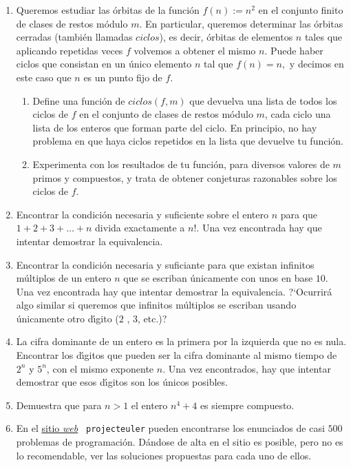 \begin{enumerate}
\item Queremos estudiar las órbitas de la función $f(n):=n^2$ en el conjunto finito de clases de restos módulo $m$. En particular, queremos determinar las órbitas cerradas (también llamadas $ciclos$),  es decir, órbitas de elementos $n$ tales que aplicando repetidas veces $f$ volvemos a obtener el mismo  $n$. Puede haber ciclos que consistan en un único elemento $n$ tal que $f(n)=n,$ y decimos en este caso que $n$ es un punto fijo de $f$.
\begin{enumerate}
 \item    Define una función de {\sage}  $ciclos(f,m)$ que devuelva una lista de todos los ciclos de $f$ en  el conjunto  de clases de restos módulo $m$, cada ciclo una lista de los enteros que forman parte del ciclo. En principio, no hay problema en que haya ciclos repetidos en la lista que devuelve tu función. 
  \item   Experimenta con los resultados de tu función, para diversos valores de $m$ primos y compuestos,  y trata de obtener conjeturas razonables sobre los ciclos de $f$.

\end{enumerate}

\item Encontrar la condici\'on necesaria y suficiente sobre el entero $n$ para que $1+2+3+\dots+n$ divida exactamente a $n!.$ Una vez encontrada hay que intentar demostrar la equivalencia.

\item Encontrar la condici\'on necesaria y suficiante para que existan infinitos m\'ultiplos de un entero $n$ que se escriban \'unicamente con unos en base $10$.  Una vez encontrada hay que intentar demostrar la equivalencia. ?`Ocurrir\'a algo similar  si queremos que infinitos m\'ultiplos se escriban usando \'unicamente otro d\'{\i}gito ($2$ , $3$, etc.)? 

\item La cifra dominante de un entero es la primera por la izquierda que no es nula. Encontrar los d\'{\i}gitos   que pueden ser la cifra dominante al mismo tiempo de $2^n$ y $5^n$, con el mismo exponente $n$.  Una vez encontrados, hay que intentar demostrar que esos d\'{\i}gitos son los \'unicos posibles. 

\item Demuestra que para $n>1$ el entero $n^4+4$ es siempre compuesto. 





\item En el \href{http://projecteuler.net/}{sitio {\itshape web}} {\tt
projecteuler} pueden encontrarse los enunciados de casi $500$ problemas de
programaci\'on. D\'andose de alta en el sitio es posible, pero no es lo
recomendable,  ver las soluciones
propuestas para cada uno de ellos.  


\end{enumerate}
